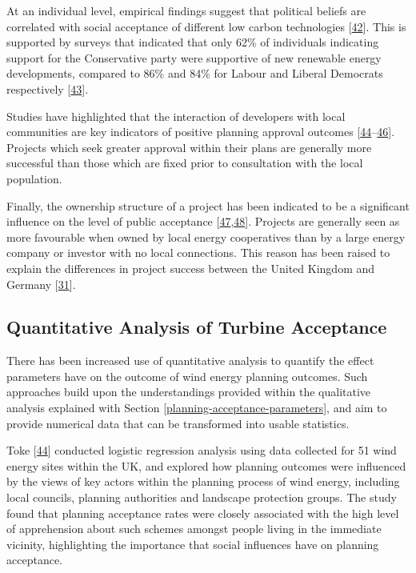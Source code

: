 \documentclass[a4paper,]{article}
\theoremstyle{definition}
\theoremstyle{definition}
\theoremstyle{definition}
\theoremstyle{remark}
\begin{document}
At an individual level, empirical findings suggest that political
beliefs are correlated with social acceptance of different low carbon
technologies {[}\protect\hyperlink{ref-Devine-Wright2007}{42}{]}. This
is supported by surveys that indicated that only 62\% of individuals
indicating support for the Conservative party were supportive of new
renewable energy developments, compared to 86\% and 84\% for Labour and
Liberal Democrats respectively
{[}\protect\hyperlink{ref-Populus2005}{43}{]}.

Studies have highlighted that the interaction of developers with local
communities are key indicators of positive planning approval outcomes
{[}\protect\hyperlink{ref-Toke2005}{44}--\protect\hyperlink{ref-Wustenhagen2007}{46}{]}.
Projects which seek greater approval within their plans are generally
more successful than those which are fixed prior to consultation with
the local population.

Finally, the ownership structure of a project has been indicated to be a
significant influence on the level of public acceptance
{[}\protect\hyperlink{ref-Sonnberger2017}{47},\protect\hyperlink{ref-Haggett2006}{48}{]}.
Projects are generally seen as more favourable when owned by local
energy cooperatives than by a large energy company or investor with no
local connections. This reason has been raised to explain the
differences in project success between the United Kingdom and Germany
{[}\protect\hyperlink{ref-Toke2008}{31}{]}.

\subsection{Quantitative Analysis of Turbine
Acceptance}\label{quantitative-analysis-of-turbine-acceptance}

There has been increased use of quantitative analysis to quantify the
effect parameters have on the outcome of wind energy planning outcomes.
Such approaches build upon the understandings provided within the
qualitative analysis explained with Section
\ref{planning-acceptance-parameters}, and aim to provide numerical data
that can be transformed into usable statistics.

Toke {[}\protect\hyperlink{ref-Toke2005}{44}{]} conducted logistic
regression analysis using data collected for 51 wind energy sites within
the UK, and explored how planning outcomes were influenced by the views
of key actors within the planning process of wind energy, including
local councils, planning authorities and landscape protection groups.
The study found that planning acceptance rates were closely associated
with the high level of apprehension about such schemes amongst people
living in the immediate vicinity, highlighting the importance that
social influences have on planning acceptance.
\end{document}
